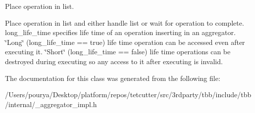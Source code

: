 Place operation in list. 

Place operation in list and either handle list or wait for operation to complete. long\+\_\+life\+\_\+time specifies life time of an operation inserting in an aggregator. \char`\"{}\+Long\char`\"{} (long\+\_\+life\+\_\+time == true) life time operation can be accessed even after executing it. \char`\"{}\+Short\char`\"{} (long\+\_\+life\+\_\+time == false) life time operations can be destroyed during executing so any access to it after executing is invalid. 

The documentation for this class was generated from the following file\+:\begin{DoxyCompactItemize}
\item 
/\+Users/pourya/\+Desktop/platform/repos/tetcutter/src/3rdparty/tbb/include/tbb/internal/\+\_\+aggregator\+\_\+impl.\+h\end{DoxyCompactItemize}
